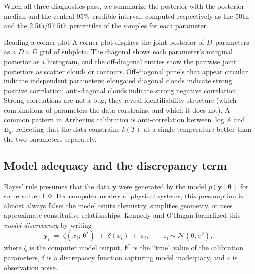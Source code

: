 \documentclass[12pt]{article}
\theoremstyle{plain}
\theoremstyle{definition}
\theoremstyle{remark}
\begin{document}
When all three diagnostics pass, we summarize the posterior with the
posterior median and the central 95\%~credible interval, computed
respectively as the 50th and the 2.5th/97.5th percentiles of the samples for
each parameter.

\begin{tutorialbox}{Reading a corner plot}
A corner plot displays the joint posterior of $D$~parameters as a
$D\times D$ grid of subplots.  The diagonal shows each parameter's marginal
posterior as a histogram, and the off-diagonal entries show the pairwise
joint posteriors as scatter clouds or contours.  Off-diagonal panels that
appear circular indicate independent parameters; elongated diagonal clouds
indicate strong positive correlation; anti-diagonal clouds indicate strong
negative correlation.  Strong correlations are not a bug; they reveal
identifiability structure (which combinations of parameters the data
constrains, and which it does not).  A common pattern in Arrhenius
calibration is anti-correlation between $\log A$ and $E_a$, reflecting that
the data constrains $k(T)$ at a single temperature better than the two
parameters separately.
\end{tutorialbox}

\subsection{Model adequacy and the discrepancy term}\label{sec:bg:adequacy}

Bayes' rule presumes that the data $\mathbf{y}$ were generated by the model
$p(\mathbf{y}\mid\boldsymbol{\theta})$ for some value of~$\boldsymbol{\theta}$.
For computer models of physical systems, this presumption is almost always
false:  the model omits chemistry, simplifies geometry, or uses approximate
constitutive relationships.  Kennedy and O'Hagan formalized this
\emph{model discrepancy} \citep{KennedyOHagan2001} by writing
%
\begin{equation}
  \mathbf{y}_i \;=\; \zeta(x_i;\,\boldsymbol{\theta}^*) \;+\;
              \delta(x_i) \;+\; \varepsilon_i,
  \qquad \varepsilon_i \sim \mathcal{N}(0,\sigma^2),
  \label{eq:KO}
\end{equation}
%
where $\zeta$ is the computer model output, $\boldsymbol{\theta}^*$ is the
``true'' value of the calibration parameters, $\delta$ is a discrepancy
function capturing model inadequacy, and $\varepsilon$ is observation noise.
\end{document}
